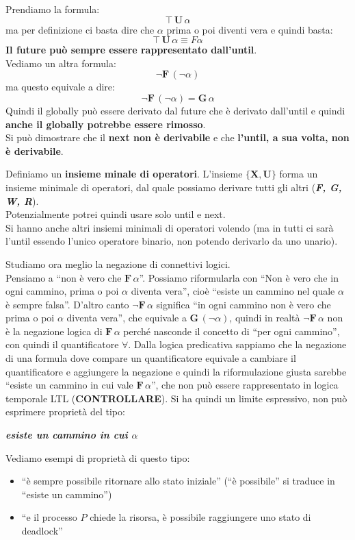 Prendiamo la formula:
\[\top\,\mathbf{U}\,\alpha\]
ma per definizione ci basta dire che $\alpha$ prima o poi diventi vera e
quindi basta:
\[\top\,\mathbf{U}\,\alpha\equiv F\alpha\]
\textbf{Il future può sempre essere rappresentato dall'until}.\\
Vediamo un altra formula:
\[\neg\mathbf{F}\,(\neg\alpha)\]
ma questo equivale a dire:
\[\neg\mathbf{F}\,(\neg\alpha)=\mathbf{G}\,\alpha\]
Quindi il globally può essere derivato dal future che è derivato dall'until e
quindi \textbf{anche il globally potrebbe essere rimosso}.\\
Si può dimostrare che il \textbf{next non è derivabile} e che \textbf{l'until, a
  sua volta, non è derivabile}. 
\begin{definizione}
  Definiamo un \textbf{insieme minale di operatori}. L'insieme
  $\{\mathbf{X},\mathbf{U}\}$ forma un insieme minimale di operatori, dal quale
  possiamo derivare tutti gli altri (\textbf{\textit{F, G, W, R}}).\\
  Potenzialmente potrei quindi usare solo until e next.\\
  Si hanno anche altri insiemi minimali di operatori volendo (ma in tutti ci
  sarà l'until essendo l'unico operatore binario, non potendo derivarlo da uno
  unario). 
\end{definizione}
\noindent
Studiamo ora meglio la negazione di connettivi logici.\\
Pensiamo a ``non è vero che $\mathbf{F}\,\alpha$''. Possiamo riformularla con
``Non è vero che in ogni cammino, prima o poi $\alpha$ diventa vera'', cioè
``esiste un cammino nel quale $\alpha$ è sempre falsa''. D'altro canto
$\neg\mathbf{F}\,\alpha$ significa ``in ogni cammino non è vero che prima o poi
$\alpha$ diventa vera'', che equivale a $\mathbf{G}\,(\neg \alpha)$, quindi in
realtà $\neg\mathbf{F}\,\alpha$ non è la negazione logica di
$\mathbf{F}\,\alpha$ perché nasconde il concetto di ``per ogni cammino'', con
quindi il quantificatore $\forall$. Dalla logica predicativa sappiamo che la
negazione di una formula dove compare un quantificatore equivale a cambiare il
quantificatore e aggiungere la negazione e quindi la riformulazione giusta
sarebbe ``esiste un cammino in cui vale $\mathbf{F}\,\alpha$'', che non può
essere rappresentato in logica temporale LTL (\textbf{CONTROLLARE}). Si ha
quindi un limite 
espressivo, non può esprimere proprietà del tipo:
\begin{center}
  \textbf{\textit{esiste un cammino in cui $\alpha$}}
\end{center}
\begin{esempio}
  Vediamo esempi di proprietà di questo tipo:
  \begin{itemize}
    \item ``è sempre possibile ritornare allo stato iniziale''
    (``è possibile'' si traduce in ``esiste un cammino'')
    \item ``e il processo $P$ chiede la risorsa, è possibile raggiungere uno
    stato di deadlock'' 
  \end{itemize}
\end{esempio}
